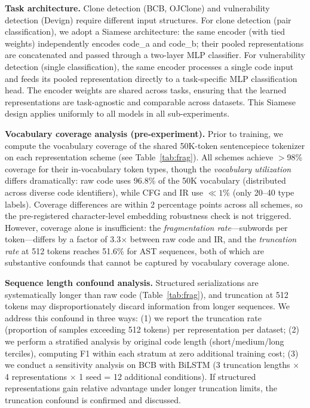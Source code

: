 \documentclass[pdflatex,sn-mathphys,Numbered]{sn-jnl}
\begin{document}
\textbf{Task architecture.} Clone detection (BCB, OJClone) and vulnerability detection (Devign) require different input structures. For clone detection (pair classification), we adopt a Siamese architecture: the same encoder (with tied weights) independently encodes code\_a and code\_b; their pooled representations are concatenated and passed through a two-layer MLP classifier. For vulnerability detection (single classification), the same encoder processes a single code input and feeds its pooled representation directly to a task-specific MLP classification head. The encoder weights are shared across tasks, ensuring that the learned representations are task-agnostic and comparable across datasets. This Siamese design applies uniformly to all models in all sub-experiments.

\textbf{Vocabulary coverage analysis (pre-experiment).} Prior to training, we compute the vocabulary coverage of the shared 50K-token sentencepiece tokenizer on each representation scheme (see Table~\ref{tab:frag}). All schemes achieve $>$98\% coverage for their in-vocabulary token types, though the \emph{vocabulary utilization} differs dramatically: raw code uses 96.8\% of the 50K vocabulary (distributed across diverse code identifiers), while CFG and IR use $\ll 1\%$ (only 20--40 type labels). Coverage differences are within 2 percentage points across all schemes, so the pre-registered character-level embedding robustness check is not triggered. However, coverage alone is insufficient: the \emph{fragmentation rate}---subwords per token---differs by a factor of 3.3$\times$ between raw code and IR, and the \emph{truncation rate} at 512 tokens reaches 51.6\% for AST sequences, both of which are substantive confounds that cannot be captured by vocabulary coverage alone.

\textbf{Sequence length confound analysis.} Structured serializations are systematically longer than raw code (Table~\ref{tab:frag}), and truncation at 512 tokens may disproportionately discard information from longer sequences. We address this confound in three ways: (1) we report the truncation rate (proportion of samples exceeding 512 tokens) per representation per dataset; (2) we perform a stratified analysis by original code length (short/medium/long terciles), computing F1 within each stratum at zero additional training cost; (3) we conduct a sensitivity analysis on BCB with BiLSTM (3 truncation lengths $\times$ 4 representations $\times$ 1 seed = 12 additional conditions). If structured representations gain relative advantage under longer truncation limits, the truncation confound is confirmed and discussed.
\end{document}
